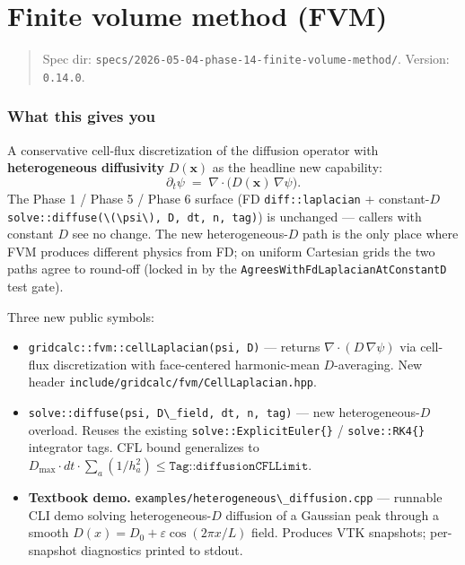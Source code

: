 \chapter{Finite volume method (FVM)}
\label{chap:finite-volume-method}

\begin{quote}
Spec dir:
\passthrough{\lstinline!specs/2026-05-04-phase-14-finite-volume-method/!}.
Version: \passthrough{\lstinline!0.14.0!}.
\end{quote}

\subsection{What this gives you}\label{phase14-what}

A conservative cell-flux discretization of the diffusion operator with
\textbf{heterogeneous diffusivity} \(D(\mathbf x)\) as the headline new
capability:
\[
\partial_t\psi \;=\; \nabla\cdot\!\big(D(\mathbf x)\,\nabla\psi\big).
\]
The Phase 1 / Phase 5 / Phase 6 surface (FD
\passthrough{\lstinline!diff::laplacian!} +
constant-\(D\) \passthrough{\lstinline!solve::diffuse(\(\psi\), D, dt, n, tag)!})
is unchanged --- callers with constant \(D\) see no change. The new
heterogeneous-\(D\) path is the only place where FVM produces
different physics from FD; on uniform Cartesian grids the two paths
agree to round-off (locked in by the
\passthrough{\lstinline!AgreesWithFdLaplacianAtConstantD!} test gate).

Three new public symbols:

\begin{itemize}
\tightlist
\item
  \passthrough{\lstinline!gridcalc::fvm::cellLaplacian(psi, D)!} ---
  returns
  \(\nabla\cdot(D\,\nabla\psi)\) via cell-flux discretization with
  face-centered harmonic-mean \(D\)-averaging. New header
  \passthrough{\lstinline!include/gridcalc/fvm/CellLaplacian.hpp!}.
\item
  \passthrough{\lstinline!solve::diffuse(psi, D\_field, dt, n, tag)!}
  --- new heterogeneous-\(D\) overload. Reuses the existing
  \passthrough{\lstinline!solve::ExplicitEuler\{\}!} /
  \passthrough{\lstinline!solve::RK4\{\}!} integrator tags. CFL bound
  generalizes to
  \(D_{\max}\cdot dt\cdot\sum_a (1/h_a^2)\le \texttt{Tag::diffusionCFLLimit}\).
\item
  \textbf{Textbook demo.}
  \passthrough{\lstinline!examples/heterogeneous\_diffusion.cpp!} ---
  runnable CLI demo solving heterogeneous-\(D\) diffusion of a Gaussian
  peak through a smooth \(D(x) = D_0 + \varepsilon\cos(2\pi x/L)\)
  field. Produces VTK snapshots; per-snapshot diagnostics printed to
  stdout.
\end{itemize}

